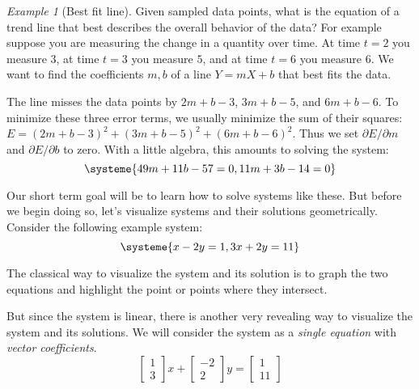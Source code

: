 \documentclass[11pt,oneside]{amsbook}
\theoremstyle{definition}
\theoremstyle{plain}
\theoremstyle{definition}
\theoremstyle{remark}
\newtheorem{example}[theorem]{Example}
\numberwithin{equation}{section}
\numberwithin{figure}{section}
\begin{document}
\begin{example}[Best fit line]
  Given sampled data points, what is the equation of a trend line that best describes the overall behavior of the data? For example suppose you are measuring the change in a quantity over time. At time $t=2$ you measure $3$, at time $t=3$ you measure $5$, and at time $t=6$ you measure $6$. We want to find the coefficients $m,b$ of a line $Y=mX+b$ that best fits the data.
  
  \begin{center}
  \end{center}

  The line misses the data points by $2m+b-3$, $3m+b-5$, and $6m+b-6$. To minimize these three error terms, we usually minimize the sum of their squares: $E=(2m+b-3)^2+(3m+b-5)^2+(6m+b-6)^2$. Thus we set $\partial E/\partial m$ and $\partial E/\partial b$ to zero. With a little algebra, this amounts to solving the system:
  \[\systeme{49m+11b-57=0,11m+3b-14=0}
  \]
\end{example}
  
Our short term goal will be to learn how to solve systems like these. But before we begin doing so, let's visualize systems and their solutions geometrically. Consider the following example system:
\[\systeme{x-2y=1,3x+2y=11}
\]

The classical way to visualize the system and its solution is to graph the two equations and highlight the point or points where they intersect.
\begin{center}
\end{center}

But since the system is linear, there is another very revealing way to visualize the system and its solutions. We will consider the system as a \emph{single equation} with \emph{vector coefficients}.
\[\begin{bmatrix}1\\3\end{bmatrix}x+\begin{bmatrix}-2\\2\end{bmatrix}y
  =\begin{bmatrix}1\\11\end{bmatrix}
\]
\end{document}

